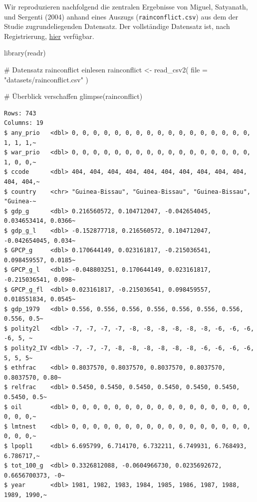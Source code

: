 \documentclass[
  a4paper,
  DIV=11,
  oneside]{scrreprt}
\newenvironment{Shaded}{\begin{snugshade}}{\end{snugshade}}
\newcommand{\AttributeTok}[1]{\textcolor[rgb]{0.40,0.45,0.13}{#1}}
\newcommand{\CommentTok}[1]{\textcolor[rgb]{0.37,0.37,0.37}{#1}}
\newcommand{\FunctionTok}[1]{\textcolor[rgb]{0.28,0.35,0.67}{#1}}
\newcommand{\NormalTok}[1]{\textcolor[rgb]{0.00,0.23,0.31}{#1}}
\newcommand{\OtherTok}[1]{\textcolor[rgb]{0.00,0.23,0.31}{#1}}
\newcommand{\StringTok}[1]{\textcolor[rgb]{0.13,0.47,0.30}{#1}}
\begin{document}
Wir reproduzieren nachfolgend die zentralen Ergebnisse von Miguel,
Satyanath, und Sergenti (2004) anhand eines Auszugs
(\texttt{rainconflict.csv}) aus dem der Studie zugrundeliegenden
Datensatz. Der vollständige Datensatz ist, nach Registrierung,
\href{https://dataverse.harvard.edu/dataset.xhtml?persistentId=doi:10.7910/DVN/27324}{hier}
verfügbar.

\begin{Shaded}
\begin{Highlighting}[]
\FunctionTok{library}\NormalTok{(readr)}

\CommentTok{\# Datensatz \textquotesingle{}rainconflict\textquotesingle{} einlesen}
\NormalTok{rainconflict }\OtherTok{\textless{}{-}} \FunctionTok{read\_csv2}\NormalTok{(}
  \AttributeTok{file =} \StringTok{"datasets/rainconflict.csv"}
\NormalTok{)}
\end{Highlighting}
\end{Shaded}

\begin{Shaded}
\begin{Highlighting}[]
\CommentTok{\# Überblick verschaffen}
\FunctionTok{glimpse}\NormalTok{(rainconflict)}
\end{Highlighting}
\end{Shaded}

\begin{verbatim}
Rows: 743
Columns: 19
$ any_prio   <dbl> 0, 0, 0, 0, 0, 0, 0, 0, 0, 0, 0, 0, 0, 0, 0, 0, 0, 1, 1, 1,~
$ war_prio   <dbl> 0, 0, 0, 0, 0, 0, 0, 0, 0, 0, 0, 0, 0, 0, 0, 0, 0, 1, 0, 0,~
$ ccode      <dbl> 404, 404, 404, 404, 404, 404, 404, 404, 404, 404, 404, 404,~
$ country    <chr> "Guinea-Bissau", "Guinea-Bissau", "Guinea-Bissau", "Guinea-~
$ gdp_g      <dbl> 0.216560572, 0.104712047, -0.042654045, 0.034653414, 0.0366~
$ gdp_g_l    <dbl> -0.152877718, 0.216560572, 0.104712047, -0.042654045, 0.034~
$ GPCP_g     <dbl> 0.170644149, 0.023161817, -0.215036541, 0.098459557, 0.0185~
$ GPCP_g_l   <dbl> -0.048803251, 0.170644149, 0.023161817, -0.215036541, 0.098~
$ GPCP_g_fl  <dbl> 0.023161817, -0.215036541, 0.098459557, 0.018551834, 0.0545~
$ gdp_1979   <dbl> 0.556, 0.556, 0.556, 0.556, 0.556, 0.556, 0.556, 0.556, 0.5~
$ polity2l   <dbl> -7, -7, -7, -7, -8, -8, -8, -8, -8, -8, -6, -6, -6, -6, 5, ~
$ polity2_IV <dbl> -7, -7, -7, -8, -8, -8, -8, -8, -8, -6, -6, -6, -6, 5, 5, 5~
$ ethfrac    <dbl> 0.8037570, 0.8037570, 0.8037570, 0.8037570, 0.8037570, 0.80~
$ relfrac    <dbl> 0.5450, 0.5450, 0.5450, 0.5450, 0.5450, 0.5450, 0.5450, 0.5~
$ oil        <dbl> 0, 0, 0, 0, 0, 0, 0, 0, 0, 0, 0, 0, 0, 0, 0, 0, 0, 0, 0, 0,~
$ lmtnest    <dbl> 0, 0, 0, 0, 0, 0, 0, 0, 0, 0, 0, 0, 0, 0, 0, 0, 0, 0, 0, 0,~
$ lpopl1     <dbl> 6.695799, 6.714170, 6.732211, 6.749931, 6.768493, 6.786717,~
$ tot_100_g  <dbl> 0.3326812088, -0.0604966730, 0.0235692672, 0.6656700373, -0~
$ year       <dbl> 1981, 1982, 1983, 1984, 1985, 1986, 1987, 1988, 1989, 1990,~
\end{verbatim}
\end{document}
